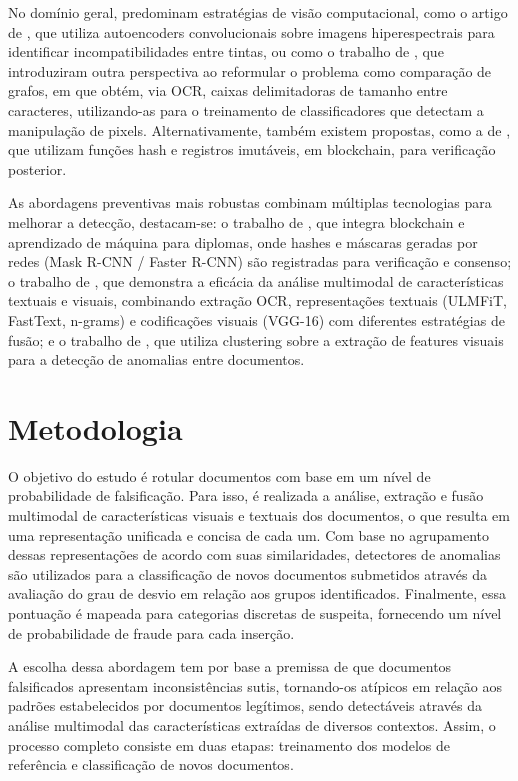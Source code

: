 \documentclass[12pt]{article}
\begin{document}
No domínio geral, predominam estratégias de visão computacional, como o artigo de \cite{inkcnn}, que utiliza autoencoders convolucionais sobre imagens hiperespectrais para identificar incompatibilidades entre tintas, ou como o trabalho de \cite{ocrgraph}, que introduziram outra perspectiva ao reformular o problema como comparação de grafos, em que obtém, via OCR, caixas delimitadoras de tamanho entre caracteres, utilizando-as para o treinamento de classificadores que detectam a manipulação de pixels. Alternativamente, também existem propostas, como a de \cite{hashdetection}, que utilizam funções hash e registros imutáveis, em blockchain, para verificação posterior.

As abordagens preventivas mais robustas combinam múltiplas tecnologias para melhorar a detecção, destacam-se: o trabalho de \cite{blockchainforgery}, que integra blockchain e aprendizado de máquina para diplomas, onde hashes e máscaras geradas por redes (Mask R-CNN / Faster R-CNN) são registradas para verificação e consenso; o trabalho de \cite{multimodal}, que demonstra a eficácia da análise multimodal de características textuais e visuais, combinando extração OCR, representações textuais (ULMFiT, FastText, n-grams) e codificações visuais (VGG-16) com diferentes estratégias de fusão; e o trabalho de \cite{clusterfraudverification}, que utiliza clustering sobre a extração de features visuais para a detecção de anomalias entre documentos.

\section{Metodologia}

O objetivo do estudo é rotular documentos com base em um nível de probabilidade de falsificação. Para isso, é realizada a análise, extração e fusão multimodal de características visuais e textuais dos documentos, o que resulta em uma representação unificada e concisa de cada um. Com base no agrupamento dessas representações de acordo com suas similaridades, detectores de anomalias são utilizados para a classificação de novos documentos submetidos através da avaliação do grau de desvio em relação aos grupos identificados. Finalmente, essa pontuação é mapeada para categorias discretas de suspeita, fornecendo um nível de probabilidade de fraude para cada inserção.

A escolha dessa abordagem tem por base a premissa de que documentos falsificados apresentam inconsistências sutis, tornando-os atípicos em relação aos padrões estabelecidos por documentos legítimos, sendo detectáveis através da análise multimodal das características extraídas de diversos contextos. Assim, o processo completo consiste em duas etapas: treinamento dos modelos de referência e classificação de novos documentos.
\end{document}

